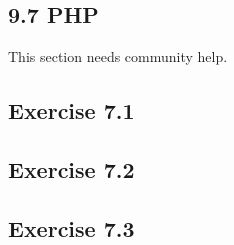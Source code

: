 \documentclass[../../main.tex]{subfiles}
\begin{document}
\subsection{9.7 PHP}

This section needs community help.

\subsection*{Exercise 7.1}

\subsection*{Exercise 7.2}

\subsection*{Exercise 7.3}
\end{document}
